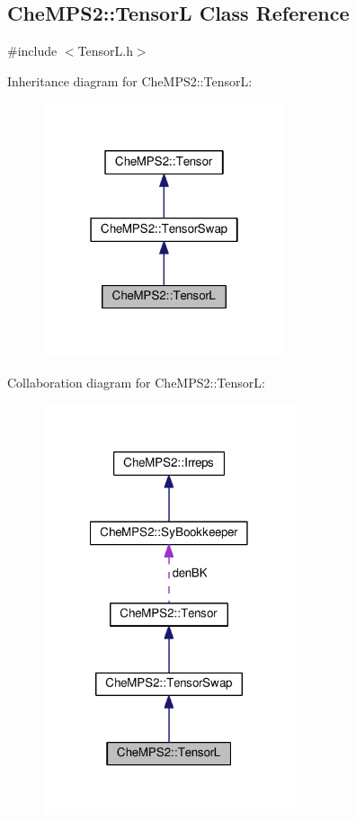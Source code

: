 \hypertarget{classCheMPS2_1_1TensorL}{\subsection{Che\-M\-P\-S2\-:\-:Tensor\-L Class Reference}
\label{classCheMPS2_1_1TensorL}
}


{\ttfamily \#include $<$Tensor\-L.\-h$>$}



Inheritance diagram for Che\-M\-P\-S2\-:\-:Tensor\-L\-:\nopagebreak
\begin{figure}[H]
\begin{center}
\leavevmode
\includegraphics[width=202pt]{classCheMPS2_1_1TensorL__inherit__graph}
\end{center}
\end{figure}


Collaboration diagram for Che\-M\-P\-S2\-:\-:Tensor\-L\-:\nopagebreak
\begin{figure}[H]
\begin{center}
\leavevmode
\includegraphics[width=210pt]{classCheMPS2_1_1TensorL__coll__graph}
\end{center}
\end{figure}
